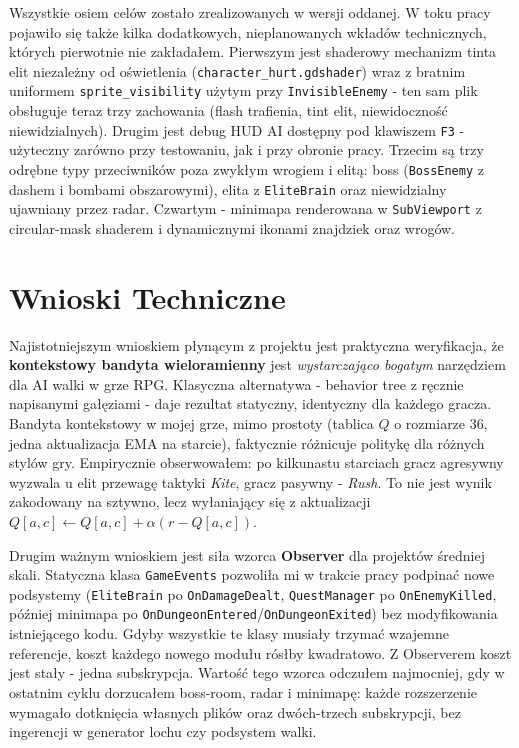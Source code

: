 Wszystkie osiem celów zostało zrealizowanych w wersji oddanej. W toku pracy pojawiło się także kilka dodatkowych, nieplanowanych wkładów technicznych, których pierwotnie nie zakładałem. Pierwszym jest shaderowy mechanizm tinta elit niezależny od oświetlenia (\texttt{character\_hurt.gdshader}) wraz z bratnim uniformem \texttt{sprite\_visibility} użytym przy \texttt{InvisibleEnemy} - ten sam plik obsługuje teraz trzy zachowania (flash trafienia, tint elit, niewidoczność niewidzialnych). Drugim jest debug HUD AI dostępny pod klawiszem \texttt{F3} - użyteczny zarówno przy testowaniu, jak i przy obronie pracy. Trzecim są trzy odrębne typy przeciwników poza zwykłym wrogiem i elitą: boss (\texttt{BossEnemy} z dashem i bombami obszarowymi), elita z \texttt{EliteBrain} oraz niewidzialny ujawniany przez radar. Czwartym - minimapa renderowana w \texttt{SubViewport} z circular-mask shaderem i dynamicznymi ikonami znajdziek oraz wrogów.

\section{Wnioski Techniczne}

Najistotniejszym wnioskiem płynącym z projektu jest praktyczna weryfikacja, że \textbf{kontekstowy bandyta wieloramienny} jest \emph{wystarczająco bogatym} narzędziem dla AI walki w grze RPG. Klasyczna alternatywa - behavior tree z ręcznie napisanymi gałęziami - daje rezultat statyczny, identyczny dla każdego gracza. Bandyta kontekstowy w mojej grze, mimo prostoty (tablica $Q$ o rozmiarze 36, jedna aktualizacja EMA na starcie), faktycznie różnicuje politykę dla różnych stylów gry. Empirycznie obserwowałem: po kilkunastu starciach gracz agresywny wyzwala u elit przewagę taktyki \textit{Kite}, gracz pasywny - \textit{Rush}. To nie jest wynik zakodowany na sztywno, lecz wyłaniający się z aktualizacji $Q[a,c] \leftarrow Q[a,c] + \alpha(r - Q[a,c])$.

Drugim ważnym wnioskiem jest siła wzorca \textbf{Observer} dla projektów średniej skali. Statyczna klasa \texttt{GameEvents} pozwoliła mi w trakcie pracy podpinać nowe podsystemy (\texttt{EliteBrain} po \texttt{OnDamageDealt}, \texttt{QuestManager} po \texttt{OnEnemyKilled}, później minimapa po \texttt{OnDungeonEntered}/\texttt{OnDungeonExited}) bez modyfikowania istniejącego kodu. Gdyby wszystkie te klasy musiały trzymać wzajemne referencje, koszt każdego nowego modułu rósłby kwadratowo. Z Observerem koszt jest stały - jedna subskrypcja. Wartość tego wzorca odczułem najmocniej, gdy w ostatnim cyklu dorzucałem boss-room, radar i minimapę: każde rozszerzenie wymagało dotknięcia własnych plików oraz dwóch-trzech subskrypcji, bez ingerencji w generator lochu czy podsystem walki.


